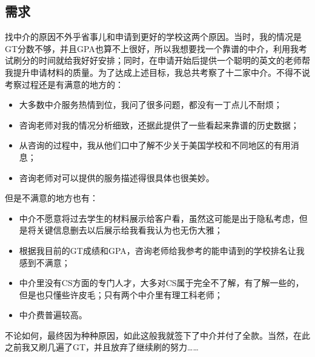 \subsection{需求}
找中介的原因不外乎省事儿和申请到更好的学校这两个原因。当时，我的情况是GT分数不够，并且GPA也算不上很好，所以我想要找一个靠谱的中介，利用我考试刷分的时间就给我好好安排；同时，在申请开始后提供一个聪明的英文的老师帮我提升申请材料的质量。为了达成上述目标，我总共考察了十二家中介。不得不说考察过程还是有满意的地方的：
\begin{itemize}
\item 大多数中介服务热情到位，我问了很多问题，都没有一丁点儿不耐烦；
\item 咨询老师对我的情况分析细致，还据此提供了一些看起来靠谱的历史数据；
\item 从咨询的过程中，我从他们口中了解不少关于美国学校和不同地区的有用消息；
\item 咨询老师对可以提供的服务描述得很具体也很美妙。
\end{itemize}

但是不满意的地方也有：
\begin{itemize}
\item 中介不愿意将过去学生的材料展示给客户看，虽然这可能是出于隐私考虑，但是将关键信息删去以后展示给我看我认为也无伤大雅；
\item 根据我目前的GT成绩和GPA，咨询老师给我参考的能申请到的学校排名让我感到不满意；
\item 中介里没有CS方面的专门人才，大多对CS属于完全不了解，有了解一些的，但是也只懂些许皮毛；只有两个中介里有理工科老师；
\item 中介费普遍较高。
\end{itemize}

不论如何，最终因为种种原因，如此这般我就签下了中介并付了全款。当然，在此之前我又刷几遍了GT，并且放弃了继续刷的努力\ldots\ldots

